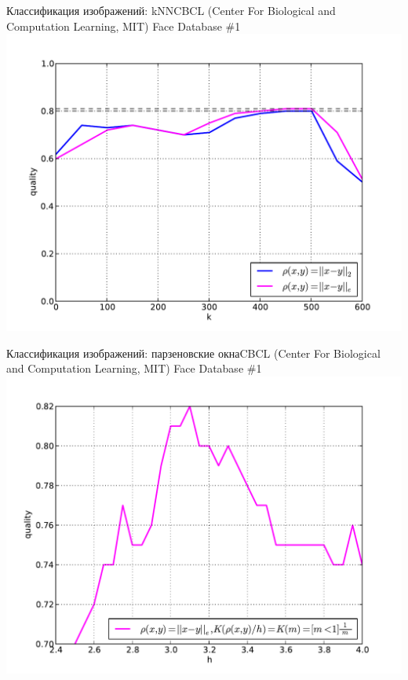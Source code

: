 \documentclass[red,unicode]{beamer}
\begin{document}
\begin{frame}{Классификация изображений: kNN}{CBCL (Center For Biological and Computation Learning, MIT) Face Database \#1}
~\\[-1.1cm]
\includegraphics[width=\textwidth]{kNN-FNF}

\end{frame}

\begin{frame}{Классификация изображений: парзеновские окна}{CBCL (Center For Biological and Computation Learning, MIT) Face Database \#1}
~\\[-1.1cm]
\includegraphics[width=\textwidth]{parzen}
\end{frame}
\end{document}
